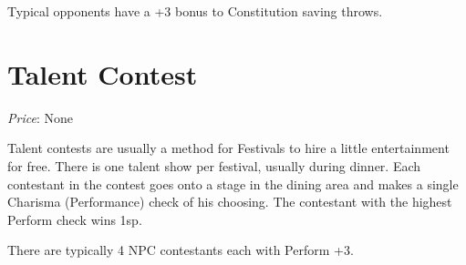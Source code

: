 \documentclass[10pt,a4paper,twoside,bg=print,twocolumn,openany,nodeprecatedcode]{dndbook}
\begin{document}
Typical opponents have a +3 bonus to Constitution saving throws.

\section{Talent Contest}
\textit{Price}: None

Talent contests are usually a method for Festivals to hire a little entertainment for free. There is one talent show per festival, usually during dinner. Each contestant in the contest goes onto a stage in the dining area and makes a single Charisma (Performance) check of his choosing. The contestant with the highest Perform check wins 1sp.

There are typically 4 NPC contestants each with Perform +3.
\end{document}
